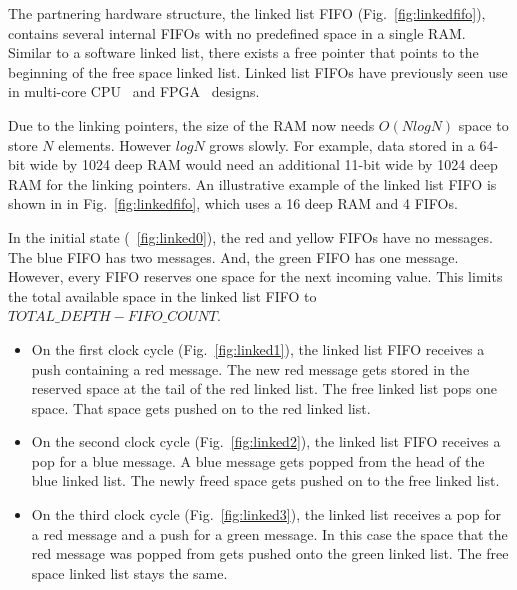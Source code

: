     The partnering hardware structure, the linked list FIFO (Fig.~\ref{fig:linkedfifo}), contains several internal FIFOs with no predefined space in a single RAM. Similar to a software linked list, there exists a free pointer that points to the beginning of the free space linked list. Linked list FIFOs have previously seen use in multi-core CPU~\cite{f-scratch:bell} and FPGA~\cite{f-scratch:nikologiannis} designs.

    Due to the linking pointers, the size of the RAM now needs $O(NlogN)$ space to store $N$ elements. However $logN$ grows slowly. For example, data stored in a 64-bit wide by 1024 deep RAM would need an additional 11-bit wide by 1024 deep RAM for the linking pointers. An illustrative example of the linked list FIFO is shown in in Fig.~\ref{fig:linkedfifo}, which uses a 16 deep RAM and 4 FIFOs.

    In the initial state (\figurename~\ref{fig:linked0}), the red and yellow FIFOs have no messages. The blue FIFO has two messages. And, the green FIFO has one message. However, every FIFO reserves one space for the next incoming value. This limits the total available space in the linked list FIFO to $TOTAL\_DEPTH-FIFO\_COUNT$.

    \begin{itemize}
        \item On the first clock cycle (Fig.~\ref{fig:linked1}), the linked list FIFO receives a push containing a red message. The new red message gets stored in the reserved space at the tail of the red linked list. The free linked list pops one space. That space gets pushed on to the red linked list.

        \item On the second clock cycle (Fig.~\ref{fig:linked2}), the linked list FIFO receives a pop for a blue message. A blue message gets popped from the head of the blue linked list. The newly freed space gets pushed on to the free linked list.

        \item On the third clock cycle (Fig.~\ref{fig:linked3}), the linked list receives a pop for a red message and a push for a green message. In this case the space that the red message was popped from gets pushed onto the green linked list. The free space linked list stays the same.
    \end{itemize}

